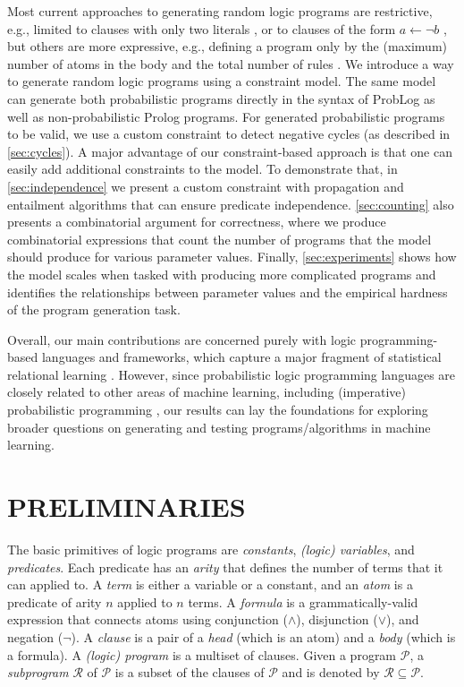 \documentclass[letterpaper]{article}
\theoremstyle{definition}
\begin{document}
Most current approaches to generating random logic programs are restrictive,
e.g., limited to clauses with only two literals
\citep{DBLP:conf/lpnmr/NamasivayamT09}, or to clauses of the form $a \gets \neg
b$ \citep{DBLP:journals/tocl/WenWSL16}, but others are more expressive, e.g.,
defining a program only by the (maximum) number of atoms in the body and the
total number of rules \citep{DBLP:conf/iclp/ZhaoL03}. We introduce a way to
generate random logic programs using a constraint model. The same model can
generate both probabilistic programs directly in the syntax of ProbLog
\citep{DBLP:conf/ijcai/RaedtKT07} as well as non-probabilistic Prolog programs.
For generated probabilistic programs to be valid, we use a custom constraint to
detect negative cycles (as described in \cref{sec:cycles}). A major advantage of
our constraint-based approach is that one can easily add additional constraints
to the model. To demonstrate that, in \cref{sec:independence} we present a
custom constraint with propagation and entailment algorithms that can ensure
predicate independence. \cref{sec:counting} also presents a combinatorial
argument for correctness, where we produce combinatorial expressions that count
the number of programs that the model should produce for various parameter
values. Finally, \cref{sec:experiments} shows how the model scales when tasked
with producing more complicated programs and identifies the relationships
between parameter values and the empirical hardness of the program generation
task.

Overall, our main contributions are concerned purely with logic programming-based
languages and frameworks, which capture a major fragment of statistical
relational learning \citep{DBLP:series/synthesis/2016Raedt}.
However, since probabilistic logic programming languages are closely related
to other areas of machine learning, including (imperative) probabilistic
programming \citep{DBLP:journals/ml/RaedtK15}, our results can lay the
foundations for exploring broader questions on generating and testing
programs/algorithms in machine learning.

\section{PRELIMINARIES}

The basic primitives of logic programs are \emph{constants}, \emph{(logic)
  variables}, and \emph{predicates}. Each predicate has an \emph{arity} that
defines the number of terms that it can applied to. A \emph{term} is either a
variable or a constant, and an \emph{atom} is a predicate of arity $n$ applied
to $n$ terms. A \emph{formula} is a grammatically-valid expression that connects
atoms using conjunction ($\land$), disjunction ($\lor$), and negation ($\neg$).
A \emph{clause} is a pair of a \emph{head} (which is an atom) and a \emph{body}
(which is a formula). A \emph{(logic) program} is a multiset of clauses. Given a
program $\mathscr{P}$, a \emph{subprogram} $\mathscr{R}$ of $\mathscr{P}$ is a
subset of the clauses of $\mathscr{P}$ and is denoted by $\mathscr{R} \subseteq
\mathscr{P}$.
\end{document}
